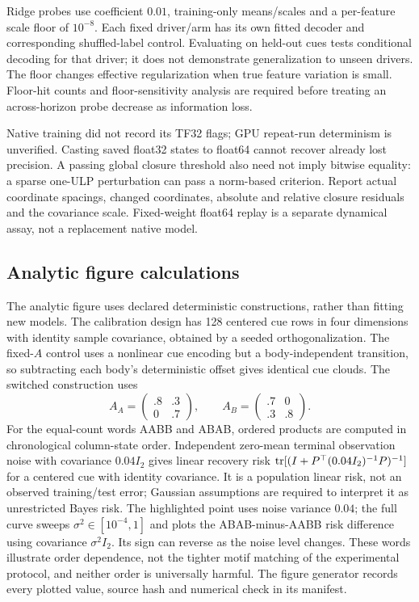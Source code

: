 Ridge probes use coefficient $0.01$, training-only means/scales and a per-feature scale floor of $10^{-8}$. Each fixed driver/arm has its own fitted decoder and corresponding shuffled-label control. Evaluating on held-out cues tests conditional decoding for that driver; it does not demonstrate generalization to unseen drivers. The floor changes effective regularization when true feature variation is small. Floor-hit counts and floor-sensitivity analysis are required before treating an across-horizon probe decrease as information loss.

Native training did not record its TF32 flags; GPU repeat-run determinism is unverified. Casting saved float32 states to float64 cannot recover already lost precision. A passing global closure threshold also need not imply bitwise equality: a sparse one-ULP perturbation can pass a norm-based criterion. Report actual coordinate spacings, changed coordinates, absolute and relative closure residuals and the covariance scale. Fixed-weight float64 replay is a separate dynamical assay, not a replacement native model.

\subsection{Analytic figure calculations}
\label{app:figure-controls}
The analytic figure uses declared deterministic constructions, rather than fitting new models. The calibration design has 128 centered cue rows in four dimensions with identity sample covariance, obtained by a seeded orthogonalization. The fixed-$A$ control uses a nonlinear cue encoding but a body-independent transition, so subtracting each body's deterministic offset gives identical cue clouds. The switched construction uses
\[
 A_A=\begin{pmatrix}.8&.3\\0&.7\end{pmatrix},\qquad
 A_B=\begin{pmatrix}.7&0\\.3&.8\end{pmatrix}.
\]
For the equal-count words AABB and ABAB, ordered products are computed in chronological column-state order. Independent zero-mean terminal observation noise with covariance $0.04I_2$ gives linear recovery risk $\operatorname{tr}[(I+P^\top(0.04I_2)^{-1}P)^{-1}]$ for a centered cue with identity covariance. It is a population linear risk, not an observed training/test error; Gaussian assumptions are required to interpret it as unrestricted Bayes risk. The highlighted point uses noise variance $0.04$; the full curve sweeps $\sigma^2\in[10^{-4},1]$ and plots the ABAB-minus-AABB risk difference using covariance $\sigma^2I_2$. Its sign can reverse as the noise level changes. These words illustrate order dependence, not the tighter motif matching of the experimental protocol, and neither order is universally harmful. The figure generator records every plotted value, source hash and numerical check in its manifest.
